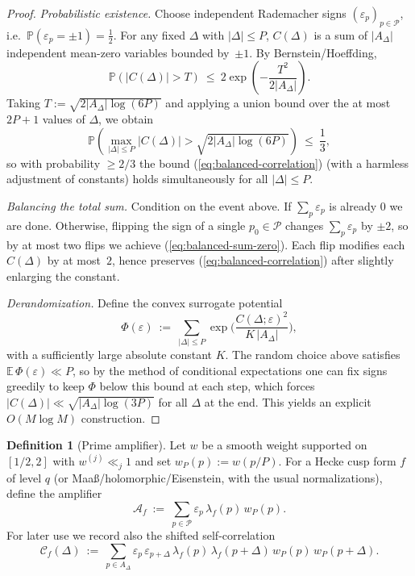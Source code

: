 \documentclass[11pt]{article}
\def\eqref#1{(\ref{#1})}%
\theoremstyle{definition}
\newtheorem{definition}[lemma]{Definition}
\theoremstyle{remark}
\numberwithin{equation}{part}
\begin{document}
\begin{proof}
	\emph{Probabilistic existence.}
	Choose independent Rademacher signs $(\varepsilon_p)_{p\in\mathcal P}$, i.e.\ $\mathbb P(\varepsilon_p=\pm1)=\tfrac12$.
	For any fixed $\Delta$ with $|\Delta|\le P$, $C(\Delta)$ is a sum of $|A_\Delta|$ independent mean-zero variables bounded by~$\pm1$.
	By Bernstein/Hoeffding,
	\[
		\mathbb P\!\left(|C(\Delta)|>T\right)\ \le\ 2\exp\!\left(-\frac{T^2}{2|A_\Delta|}\right).
	\]
	Taking $T:=\sqrt{2|A_\Delta|\log(6P)}$ and applying a union bound over the at most $2P+1$ values of $\Delta$, we obtain
	\[
		\mathbb P\!\left(\max_{|\Delta|\le P}|C(\Delta)|> \sqrt{2|A_\Delta|\log(6P)}\right)
		\ \le\ \frac{1}{3},
	\]
	so with probability $\ge 2/3$ the bound \eqref{eq:balanced-correlation} (with a harmless adjustment of constants) holds simultaneously for all $|\Delta|\le P$.

	\emph{Balancing the total sum.}
	Condition on the event above. If $\sum_{p}\varepsilon_p$ is already $0$ we are done.
	Otherwise, flipping the sign of a single $p_0\in\mathcal P$ changes $\sum_p\varepsilon_p$ by $\pm2$, so by at most two flips we achieve \eqref{eq:balanced-sum-zero}.
	Each flip modifies each $C(\Delta)$ by at most~$2$, hence preserves \eqref{eq:balanced-correlation} after slightly enlarging the constant.

	\emph{Derandomization.}
	Define the convex surrogate potential
	\[
		\Phi(\varepsilon)\ :=\ \sum_{|\Delta|\le P}\exp\!\Big(\frac{C(\Delta;\varepsilon)^2}{K\,|A_\Delta|}\Big),
	\]
	with a sufficiently large absolute constant $K$.
	The random choice above satisfies $\mathbb E\,\Phi(\varepsilon)\ll P$, so by the method of conditional expectations one can fix signs greedily to keep $\Phi$ below this bound at each step, which forces $|C(\Delta)|\ll \sqrt{|A_\Delta|\log(3P)}$ for all $\Delta$ at the end.
	This yields an explicit $O(M\log M)$ construction.
\end{proof}

\begin{definition}[Prime amplifier]\label{def:amplifier}
	Let $w$ be a smooth weight supported on $[1/2,2]$ with $w^{(j)}\ll_j 1$ and set $w_P(p):=w(p/P)$.
	For a Hecke cusp form $f$ of level $q$ (or Maa\ss/holomorphic/Eisenstein, with the usual normalizations), define the amplifier
	\[
		\mathcal A_f\ :=\ \sum_{p\in\mathcal P}\varepsilon_p\,\lambda_f(p)\,w_P(p).
	\]
	For later use we record also the shifted self-correlation
	\[
		\mathcal C_f(\Delta)\ :=\ \sum_{p\in A_\Delta}\varepsilon_p\,\varepsilon_{p+\Delta}\,
		\lambda_f(p)\,\lambda_f(p+\Delta)\,w_P(p)\,w_P(p+\Delta).
	\]
\end{definition}
\end{document}
